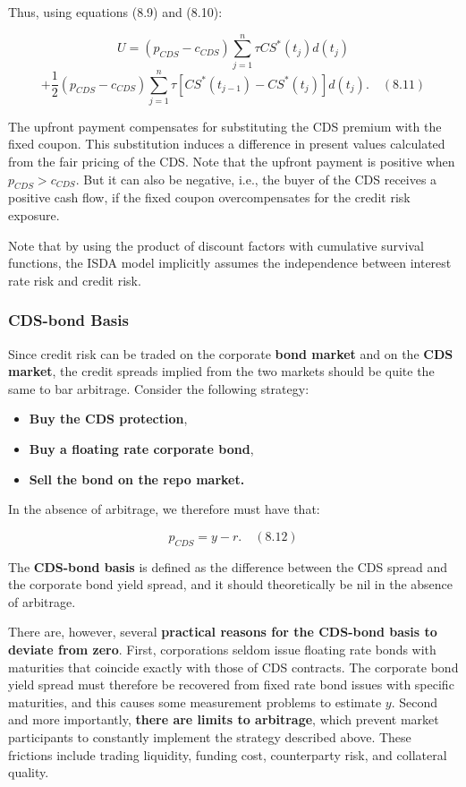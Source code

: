 \documentclass[12pt,a4paper]{article}
\begin{document}
Thus, using equations (8.9) and (8.10):

$$U = (p_{CDS} - c_{CDS}) \sum_{j=1}^{n} \tau CS^*(t_j)d(t_j)$$
$$+ \frac{1}{2}(p_{CDS} - c_{CDS}) \sum_{j=1}^{n} \tau [CS^*(t_{j-1}) - CS^*(t_j)]d(t_j). \quad (8.11)$$

The upfront payment compensates for substituting the CDS premium with the fixed coupon. This substitution induces a difference in present values calculated from the fair pricing of the CDS. Note that the upfront payment is positive when $p_{CDS} > c_{CDS}$. But it can also be negative, i.e., the buyer of the CDS receives a positive cash flow, if the fixed coupon overcompensates for the credit risk exposure.

Note that by using the product of discount factors with cumulative survival functions, the ISDA model implicitly assumes the independence between interest rate risk and credit risk.



\subsubsection{CDS-bond Basis}

Since credit risk can be traded on the corporate \textbf{bond market} and on the \textbf{CDS market}, the credit spreads implied from the two markets should be quite the same to bar arbitrage. Consider the following strategy:

\begin{itemize}
\item \textbf{Buy the CDS protection},
\item \textbf{Buy a floating rate corporate bond},
\item \textbf{Sell the bond on the repo market.}
\end{itemize}

In the absence of arbitrage, we therefore must have that:

$$p_{CDS} = y - r. \quad (8.12)$$

The \textbf{CDS-bond basis} is defined as the difference between the CDS spread and the corporate bond yield spread, and it should theoretically be nil in the absence of arbitrage.

There are, however, several \textbf{practical reasons for the CDS-bond basis to} \textbf{deviate from zero}. First, corporations seldom issue floating rate bonds with maturities that coincide exactly with those of CDS contracts. The corporate bond yield spread must therefore be recovered from fixed rate bond issues with specific maturities, and this causes some measurement problems to estimate $y$. Second and more importantly, \textbf{there are limits to arbitrage}, which prevent market participants to constantly implement the strategy described above. These frictions include trading liquidity, funding cost, counterparty risk, and collateral quality.
\end{document}
